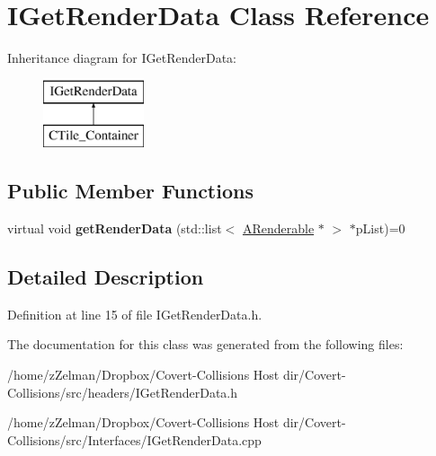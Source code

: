 \hypertarget{classIGetRenderData}{\section{I\-Get\-Render\-Data Class Reference}
\label{classIGetRenderData}
}
Inheritance diagram for I\-Get\-Render\-Data\-:\begin{figure}[H]
\begin{center}
\leavevmode
\includegraphics[height=2.000000cm]{classIGetRenderData}
\end{center}
\end{figure}
\subsection*{Public Member Functions}
\begin{DoxyCompactItemize}
\item 
\hypertarget{classIGetRenderData_ac98527f07b6d1b5030786b4848cca867}{virtual void {\bfseries get\-Render\-Data} (std\-::list$<$ \hyperlink{classARenderable}{A\-Renderable} $\ast$ $>$ $\ast$p\-List)=0}\label{classIGetRenderData_ac98527f07b6d1b5030786b4848cca867}

\end{DoxyCompactItemize}


\subsection{Detailed Description}


Definition at line 15 of file I\-Get\-Render\-Data.\-h.



The documentation for this class was generated from the following files\-:\begin{DoxyCompactItemize}
\item 
/home/z\-Zelman/\-Dropbox/\-Covert-\/\-Collisions Host dir/\-Covert-\/\-Collisions/src/headers/I\-Get\-Render\-Data.\-h\item 
/home/z\-Zelman/\-Dropbox/\-Covert-\/\-Collisions Host dir/\-Covert-\/\-Collisions/src/\-Interfaces/I\-Get\-Render\-Data.\-cpp\end{DoxyCompactItemize}
